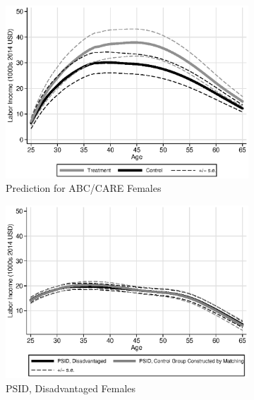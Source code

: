 \begin{figure}
\centering
\caption{Labor Income Profile, Predictions and Comparison to PSID}\label{fig:labor-income-profiles}
\begin{subfigure}[h]{0.4\textwidth}
		\centering
		\caption{Prediction for ABC/CARE Females} \label{fig:labor-income-profilesa}
		\includegraphics[width=\textwidth]{output/labor_25-65_pset1_mset3_female.eps}
\end{subfigure}%
\begin{subfigure}[h]{0.4\textwidth}
	\centering
	\caption{PSID, Disadvantaged Females} \label{fig:labor-income-profilesb}
		\includegraphics[width=\textwidth]{output/psid_B0_match_s0}
\end{subfigure}
\begin{subfigure}[h]{0.4\textwidth}

\end{subfigure}
\end{figure}
